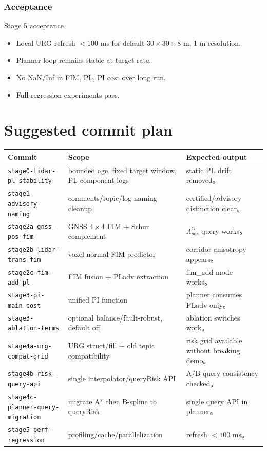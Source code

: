 \documentclass[11pt,a4paper]{article}
\newcommand{\Lam}{\Lambda}
\begin{document}
\subsubsection{Acceptance}
\begin{acceptbox}{Stage 5 acceptance}
\begin{itemize}
  \item Local URG refresh $<100$ ms for default $30\times30\times8$ m, 1 m resolution.
  \item Planner loop remains stable at target rate.
  \item No NaN/Inf in FIM, PL, PI cost over long run.
  \item Full regression experiments pass.
\end{itemize}
\end{acceptbox}

\section{Suggested commit plan}

\begin{center}
\small
\begin{tabularx}{\linewidth}{lY Y}
  \toprule
  \textbf{Commit} & \textbf{Scope} & \textbf{Expected output} \\
  \midrule
  \texttt{stage0-lidar-pl-stability} & bounded age, fixed target window, PL component logs & static PL drift removed。\\
  \texttt{stage1-advisory-naming} & comments/topic/log naming cleanup & certified/advisory distinction clear。\\
  \texttt{stage2a-gnss-pos-fim} & GNSS $4\times4$ FIM + Schur complement & $\Lam^G_{pos}$ query works。\\
  \texttt{stage2b-lidar-trans-fim} & voxel normal FIM predictor & corridor anisotropy appears。\\
  \texttt{stage2c-fim-add-pl} & FIM fusion + PLadv extraction & fim\_add mode works。\\
  \texttt{stage3-pi-main-cost} & unified PI function & planner consumes PLadv only。\\
  \texttt{stage3-ablation-terms} & optional balance/fault-robust, default off & ablation switches work。\\
  \texttt{stage4a-urg-compat-grid} & URG struct/fill + old topic compatibility & risk grid available without breaking demo。\\
  \texttt{stage4b-risk-query-api} & single interpolator/queryRisk API & A/B query consistency checked。\\
  \texttt{stage4c-planner-query-migration} & migrate A* then B-spline to queryRisk & single query API in planner。\\
  \texttt{stage5-perf-regression} & profiling/cache/parallelization & refresh $<100$ ms。\\
  \bottomrule
\end{tabularx}
\end{center}
\end{document}
